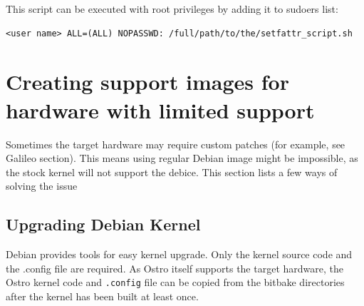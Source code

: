 \documentclass[a4paper,11pt]{article}
\newcommand{\cmd}[1]{\texttt{#1}}
\begin{document}
This script can be executed with root privileges by adding it to sudoers list:

\begin{lstlisting}
<user name> ALL=(ALL) NOPASSWD: /full/path/to/the/setfattr_script.sh
\end{lstlisting}

\pagebreak

\section{Creating support images for hardware with limited support}

Sometimes the target hardware may require custom patches (for example, see Galileo section). This means using regular Debian image might be impossible, as the stock kernel will not support the debice. This section lists a few ways of solving the issue

\subsection*{Upgrading Debian Kernel}

Debian provides tools for easy kernel upgrade. Only the kernel source code and the .config file are required. As Ostro itself supports the target hardware, the Ostro kernel code and \cmd{.config} file can be copied from the bitbake directories after the kernel has been built at least once. 
\end{document}
